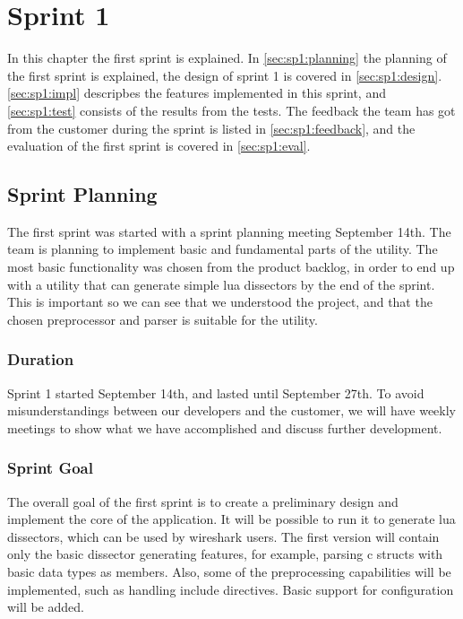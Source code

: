\chapter{Sprint 1}
In this chapter the first sprint is explained. In \autoref{sec:sp1:planning} 
the planning of the first sprint is explained, the design of sprint 1 is 
covered in \autoref{sec:sp1:design}. \autoref{sec:sp1:impl} descripbes the 
features implemented in this sprint, and \autoref{sec:sp1:test} consists of 
the results from the tests. The feedback the team has got from the customer 
during the sprint is listed in \autoref{sec:sp1:feedback}, and the evaluation 
of the first sprint is covered in \autoref{sec:sp1:eval}.


\section{Sprint Planning}
\label{sec:sp1:planning}
The first sprint was started with a sprint planning meeting September 14th. 
The team is planning to implement basic and fundamental parts of the 
\gls{utility}. The most basic functionality was chosen from the product 
backlog, in order to end up with a utility that can generate simple 
\Gls{lua} \glspl{dissector} by the end of the sprint. This is important so we can see that we 
understood the project, and that the chosen \gls{preprocessor} and 
\gls{parser} is suitable for the utility.

\subsection{Duration}
Sprint 1 started September 14th, and lasted until September 27th. To avoid
misunderstandings between our developers and the customer, we will have weekly
meetings to show what we have accomplished and discuss further development. 

\subsection{Sprint Goal}
The overall goal of the first sprint is to create a preliminary design and
implement the core of the application. It will be possible to run it to
generate \Gls{lua} \glspl{dissector}, which can be used by \Gls{wireshark} users. The first
version will contain only the basic \gls{dissector} generating features, for example,
parsing \Gls{c} \glspl{struct} with basic data types as \glspl{member}. Also, some of the
preprocessing capabilities will be implemented, such as handling \gls{include}
directives. Basic support for configuration will be added.

